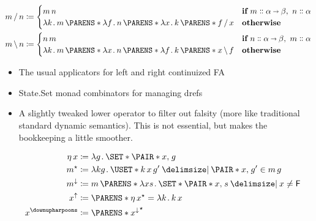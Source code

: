 \documentclass[10pt,fleqn]{article}
\begin{document}
\setlength\abovedisplayskip{0pt}
\setlength\belowdisplayskip{0pt}
\setlength\abovedisplayshortskip{0pt}
\setlength\belowdisplayshortskip{0pt}


\begin{minipage}[t]{0.365\textwidth} %
\begin{spreadlines}{0pt}
\begin{align*}
  m \fsl n
  &\coloneq
  \begin{cases}
    m\,n
    &\textbf{if}\ m \dblcolon \alpha\sto\beta,\ n \dblcolon \alpha \\
    \l k \dt m\,\p{\l f \dt n\,\p{\l x \dt k\,\p{f \fsl x}}}
    &\textbf{otherwise}
  \end{cases} \\
  m \bsl n
  &\coloneq
  \begin{cases}
    n\,m
    &\textbf{if}\ n \dblcolon \alpha\sto\beta,\ m \dblcolon \alpha \\
    \l k \dt m\,\p{\l x \dt n\,\p{\l f \dt k\,\p{x \bsl f}}}
    &\textbf{otherwise}
  \end{cases}
\end{align*}
\end{spreadlines}
\end{minipage}
%
%
\begin{minipage}[t]{0.35\textwidth}
  \begin{itemize}[label={}]
  \item
    The usual applicators for left and right continuized FA
  \item
    State.Set monad combinators for managing drefs
  \item
    A slightly tweaked lower operator to filter out falsity (more like
    traditional standard dynamic semantics). This is not essential, but makes
    the bookkeeping a little smoother.
\end{itemize}
\end{minipage}
%
%
\begin{minipage}[t]{0.285\textwidth} %
\begin{spreadlines}{0pt}
\begin{align*}
  &&
  \eta\,x &\coloneq
  \l g \dt \set{\pair{x}{g}} \\
  &&
  m^{\bind} &\coloneq
  \l kg \dt \uset{k\,x\,g' \giv \pair{x}{g'} \in m\,g} \\
  &&
  m^\dnar &\coloneq
  m\,\p{\l xs \dt \set{\pair{x}{s} \giv x \neq \cn{F}}} \\
  &&
  x^\upar &\coloneq
  \p{\eta\,x}^{\bind} = \l k \dt k\,x \\
  &&
  x^\reset &\coloneq
  \p{x^\dnar}^{\bind}
\end{align*}
\end{spreadlines}
\end{minipage}
\end{document}
